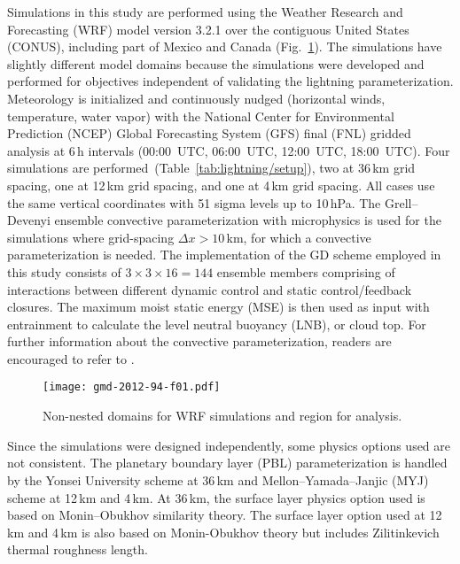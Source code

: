 Simulations in this study are performed using the Weather Research and
Forecasting (WRF) model version 3.2.1 \citep{Skamarock:2008xx} over the
contiguous United States (CONUS), including part of Mexico and Canada
(Fig.~\ref{fig:lightning/domain}). The simulations have slightly different model
domains because the simulations were developed and performed for objectives
independent of validating the lightning parameterization. Meteorology is
initialized and continuously nudged (horizontal winds, temperature, water
vapor) with the National Center for Environmental Prediction (NCEP) Global
Forecasting System (GFS) final (FNL) gridded analysis at 6\,h intervals
(00:00~UTC, 06:00~UTC, 12:00~UTC, 18:00~UTC).
Four simulations are performed~(Table~\ref{tab:lightning/setup}),
two at 36\,\unit{km} grid spacing, one at 12\,\unit{km} grid spacing, and one
at 4\,\unit{km} grid spacing. All cases use the same vertical coordinates
with 51 sigma levels up to 10\,\unit{hPa}. The Grell--Devenyi ensemble
convective parameterization \citep{Grell:2002bs} with \citet{Thompson:2008vn}
microphysics is used for the simulations where grid-spacing $\Delta x >
10$\,km, for which a convective parameterization is needed. The
implementation of the GD scheme employed in this study consists of $3 \times
3 \times 16=144$ ensemble members comprising of interactions between
different dynamic control and static control/feedback closures. The maximum
moist static energy (MSE) is then used as input with entrainment to calculate
the level neutral buoyancy (LNB), or cloud top. For further information about
the convective parameterization, readers are encouraged to refer to
\citet{Grell:1993dz}.

\begin{figure}[t]
      \texttt{[image: gmd-2012-94-f01.pdf]}
      \caption[Domain for lightning simulations]{Non-nested domains for WRF simulations and region for analysis.}
      \label{fig:lightning/domain}
\end{figure}

Since the simulations were designed independently, some physics options used
are not consistent. The planetary \mbox{boundary} layer (PBL) parameterization is
handled by the Yonsei University scheme \citep{Hong:2006fk} at 36\,\unit{km}
and Mellon--Yamada--Janjic (MYJ) scheme \citep{Janjic:1994fk} at 12\,\unit{km}
and 4\,\unit{km}. At 36\,\unit{km}, the surface layer physics option used is
based on Monin--Obukhov similarity theory. The surface layer option used at
12\,\unit{km} and 4\,\unit{km} is also based on Monin-Obukhov theory but
includes Zilitinkevich thermal roughness length.

